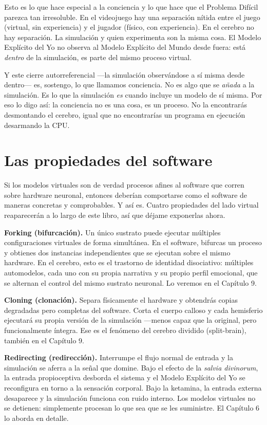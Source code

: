 \documentclass[11pt, twoside, openright]{book}
\begin{document}
Esto es lo que hace especial a la conciencia y lo que hace que el Problema Difícil parezca tan irresoluble. En el videojuego hay una separación nítida entre el juego (virtual, sin experiencia) y el jugador (físico, con experiencia). En el cerebro no hay separación. La simulación y quien experimenta son la misma cosa. El Modelo Explícito del Yo no observa al Modelo Explícito del Mundo desde fuera: está \textit{dentro} de la simulación, es parte del mismo proceso virtual.

Y este cierre autorreferencial ---la simulación observándose a sí misma desde dentro--- es, sostengo, lo que llamamos conciencia. No es algo que se \textit{añada} a la simulación. Es lo que la simulación \textit{es} cuando incluye un modelo de sí misma. Por eso lo digo así: la conciencia no es una cosa, es un proceso. No la encontrarás desmontando el cerebro, igual que no encontrarías un programa en ejecución desarmando la CPU.

\section*{Las propiedades del software}

Si los modelos virtuales son de verdad procesos afines al software que corren sobre hardware neuronal, entonces deberían comportarse como el software de maneras concretas y comprobables. Y así es. Cuatro propiedades del lado virtual reaparecerán a lo largo de este libro, así que déjame exponerlas ahora.

\textbf{Forking (bifurcación).} Un único sustrato puede ejecutar múltiples configuraciones virtuales de forma simultánea. En el software, bifurcas un proceso y obtienes dos instancias independientes que se ejecutan sobre el mismo hardware. En el cerebro, esto es el trastorno de identidad disociativo: múltiples automodelos, cada uno con su propia narrativa y su propio perfil emocional, que se alternan el control del mismo sustrato neuronal. Lo veremos en el Capítulo 9.

\textbf{Cloning (clonación).} Separa físicamente el hardware y obtendrás copias degradadas pero completas del software. Corta el cuerpo calloso y cada hemisferio ejecutará su propia versión de la simulación ---menos capaz que la original, pero funcionalmente íntegra. Ese es el fenómeno del cerebro dividido (split-brain), también en el Capítulo 9.

\textbf{Redirecting (redirección).} Interrumpe el flujo normal de entrada y la simulación se aferra a la señal que domine. Bajo el efecto de la \textit{salvia divinorum}, la entrada propioceptiva desborda el sistema y el Modelo Explícito del Yo se reconfigura en torno a la sensación corporal. Bajo la ketamina, la entrada externa desaparece y la simulación funciona con ruido interno. Los modelos virtuales no se detienen: simplemente procesan lo que sea que se les suministre. El Capítulo 6 lo aborda en detalle.
\end{document}
